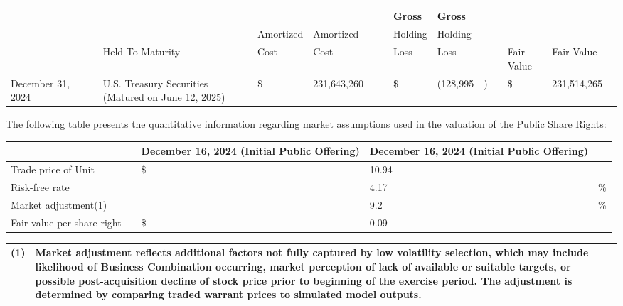 \documentclass[11pt,a4paper]{article}
\begin{document}
\begin{table}[h]
\begin{tabular}{|l|l|l|l|l|l|l|l|l|l|l|l|l|l|l|l|}
\hline
 &  &  &  &  &  &  &  &  & Gross & Gross &  &  &  &  &  \\ \hline
 &  &  &  &  & Amortized & Amortized &  &  & Holding & Holding &  &  &  &  &  \\ \hline
 &  &  & Held To Maturity &  & Cost & Cost &  &  & Loss & Loss &  &  & Fair Value & Fair Value &  \\ \hline
December 31, 2024 &  &  & U.S. Treasury Securities (Matured on June 12, 2025) &  & \$ & 231,643,260 &  &  & \$ & (128,995 & ) &  & \$ & 231,514,265 &  \\ \hline
\end{tabular}
\end{table}

The following table presents the quantitative information regarding market assumptions used in the valuation of the Public Share Rights:

\begin{table}[h]
\begin{tabular}{|l|l|l|l|l|}
\hline
 &  & \textbf{December 16, 2024}  \textbf{(Initial Public Offering)} & \textbf{December 16, 2024}  \textbf{(Initial Public Offering)} &  \\ \hline
Trade price of Unit &  & \$ & 10.94 &  \\ \hline
Risk-free rate &  &  & 4.17 & \% \\ \hline
Market adjustment(1) &  &  & 9.2 & \% \\ \hline
Fair value per share right &  & \$ & 0.09 &  \\ \hline
\end{tabular}
\end{table}

\begin{table}[h]
\begin{tabular}{|l|l|}
\hline
(1) & Market adjustment reflects additional factors not fully captured by low volatility selection, which may include likelihood of Business Combination occurring, market perception of lack of available or suitable targets, or possible post-acquisition decline of stock price prior to beginning of the exercise period. The adjustment is determined by comparing traded warrant prices to simulated model outputs. \\ \hline
\end{tabular}
\end{table}
\end{document}
